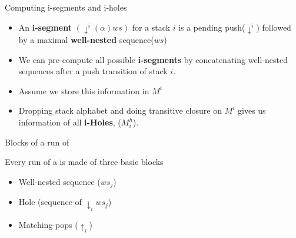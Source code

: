 \documentclass{beamer}
\begin{document}
        \begin{frame}{Computing i-segments and i-holes}
        \begin{itemize}[<+->]
              \item An \textbf{i-segment} $(\downarrow^i(\alpha)ws)$ for a
               stack $i$ is a pending push($\downarrow^i$) followed by
               a maximal \textbf{well-nested} sequence($ws$)
                

              \item  We can pre-compute all possible \textbf{i-segments} by concatenating well-nested sequences after a push transition of stack $i$. 
              
              \item Assume we store this information in $M^i$
              

              \item Dropping stack alphabet and doing transitive closure
               on $M^i$ gives us information of all \textbf{i-Holes}, ($M^h_i$).
               \end{itemize}

               
                 \begin{center}
                 
  \end{center}  
              \end{frame}
      \begin{frame}{Blocks of a run of \mpda{}}
  
 
  Every run of a \mpda{} is made of three basic blocks 
  \begin{itemize}
  \item Well-nested sequence ($ws_{j}$)
  \item Hole (sequence of $\downarrow_{i}ws_{j}$)
    \item Matching-pops ($\uparrow_{i}$)
  \end{itemize}
\end{frame}
\end{document}
